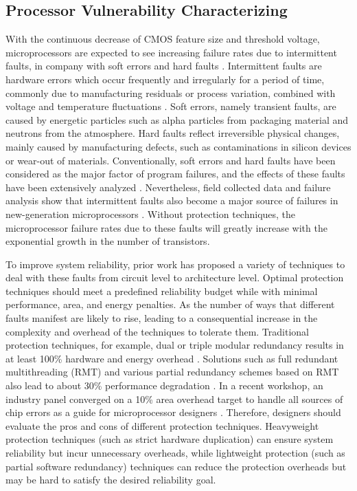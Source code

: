 \subsection{Processor Vulnerability Characterizing}
With the continuous decrease of CMOS feature size and threshold voltage, microprocessors are expected to see increasing failure rates due to intermittent faults, in company with soft errors and hard faults \cite{mcpherson2006reliability} \cite{constantinescu2003trends} \cite{karnik2004characterization}. Intermittent faults are hardware errors which occur frequently and irregularly for a period of time, commonly due to manufacturing residuals or process variation, combined with voltage and temperature fluctuations \cite{constantinescu2002impact} \cite{wells2008adapting}. Soft errors, namely transient faults, are caused by energetic particles such as alpha particles from packaging material and neutrons from the atmosphere. Hard faults reflect irreversible physical changes, mainly caused by manufacturing defects, such as contaminations in silicon devices or wear-out of materials. Conventionally, soft errors and hard faults have been considered as the major factor of program failures, and the effects of these faults have been extensively analyzed \cite{shivakumar2002modeling} \cite{srinivasan2004impact}. Nevertheless, field collected data and failure analysis show that intermittent faults also become a major source of failures in new-generation microprocessors \cite{constantinescu2008intermittent}. Without protection techniques, the microprocessor failure rates due to these faults will greatly increase with the exponential growth in the number of transistors.

To improve system reliability, prior work has proposed a variety of techniques to deal with these faults from circuit level to architecture level. Optimal protection techniques should meet a predefined reliability budget while with minimal performance, area, and energy penalties. As the number of ways that different faults manifest are likely to rise, leading to a consequential increase in the complexity and overhead of the techniques to tolerate them. Traditional protection techniques, for example, dual or triple modular redundancy results in at least 100\% hardware and energy overhead \cite{Slegel1999IBM} \cite{wood1999data}. Solutions such as full redundant multithreading (RMT) and various partial redundancy schemes based on RMT also lead to about 30\% performance degradation \cite{mukherjee2002detailed} \cite{reinhardt2000transient} \cite{parashar2006slick} \cite{shyam2006ultra}. In a recent workshop, an industry panel converged on a 10\% area overhead target to handle all sources of chip errors as a guide for microprocessor designers \cite{li2008understanding}. Therefore, designers should evaluate the pros and cons of different protection techniques. Heavyweight protection techniques (such as strict hardware duplication) can ensure system reliability but incur unnecessary overheads, while lightweight protection (such as partial software redundancy) techniques can reduce the protection overheads but may be hard to satisfy the desired reliability goal.

